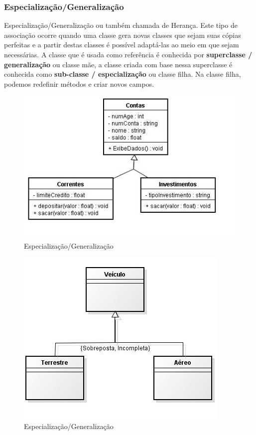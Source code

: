 \subsubsection{Especialização/Generalização}

Especialização/Generalização ou também chamada de Herança. Este tipo de associação ocorre quando uma classe gera novas classes que sejam suas cópias perfeitas e a partir destas classes é possível adaptá-las ao meio em que sejam necessárias. A classe que é usada como referência é conhecida por \textbf{superclasse / generalização} ou classe mãe, a classe criada com base nessa superclasse é conhecida como \textbf{sub-classe / especialização} ou classe filha. Na classe filha, podemos redefinir métodos e criar novos campos.

\begin{figure}[H]
	\centering
	\includegraphics[scale=0.8]{imagens/heranca.jpg}
	\caption{Especialização/Generalização}
	\label{fig:composicao1}
\end{figure}

\begin{figure}[H]
	\centering
	\includegraphics[scale=0.8]{imagens/9.JPG}
	\caption{Especialização/Generalização}
	\label{fig:composicao2}
\end{figure}

